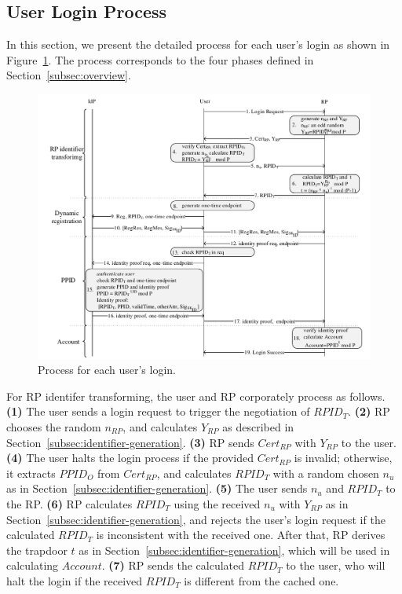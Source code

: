 \subsection{User Login Process}
\label{sebsec:loginprocess}
In this section, we present the detailed process for each user's login as shown in Figure~\ref{fig:process}. The process corresponds to the four phases defined in Section~\ref{subsec:overview}.

\begin{figure}
  \centering
  \includegraphics[width=\linewidth]{fig/process.pdf}
  \caption{Process for each user's login.}
  \label{fig:process}
\end{figure}

For RP identifer transforming, the user and RP corporately process as follows. \textbf{(1)} The user sends a login request to trigger the negotiation of $RPID_T$. \textbf{(2)} RP chooses the random $n_{RP}$, and calculates $Y_{RP}$ as described in Section~\ref{subsec:identifier-generation}. \textbf{(3)} RP sends $Cert_{RP}$ with $Y_{RP}$ to the user.  \textbf{(4)} The user halts the login process if the provided $Cert_{RP}$ is invalid; otherwise, it extracts $PPID_O$ from $Cert_{RP}$, and calculates $RPID_T$ with a random chosen $n_u$ as in Section~\ref{subsec:identifier-generation}. \textbf{(5)} The user sends $n_u$ and $RPID_T$ to the RP. \textbf{(6)} RP calculates $RPID_T$ using the received $n_u$ with $Y_{RP}$ as in Section~\ref{subsec:identifier-generation}, and rejects the user's login request if the calculated $RPID_T$ is inconsistent with the received one. After that, RP derives the trapdoor $t$ as in Section~\ref{subsec:identifier-generation}, which will be used in calculating $Account$. \textbf{(7)} RP sends the calculated $RPID_T$ to the user, who will halt the login if the received $RPID_T$ is different from the cached one.

